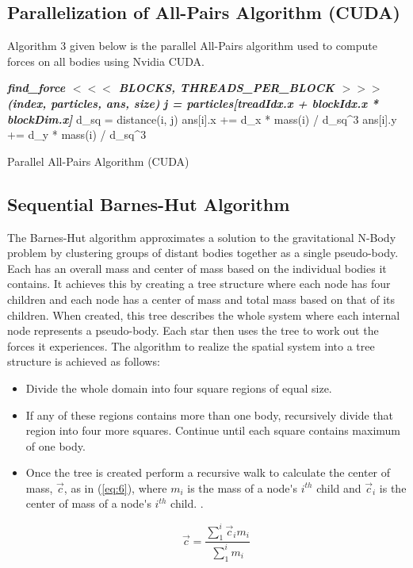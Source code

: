\subsection{Parallelization of All-Pairs Algorithm (CUDA)}

Algorithm 3 given below is the parallel All-Pairs algorithm used to compute forces on all bodies using Nvidia CUDA.

\begin{algorithm} 
\DontPrintSemicolon
{}
 {
   {
    \textbf{\textit{find\_force $<<<$ BLOCKS, THREADS\_PER\_BLOCK $>>>$ (index, particles, ans, size)}} \;
  }
}
\BlankLine
{}
 {
  \textbf{\textit{j = particles[treadIdx.x + blockIdx.x * blockDim.x]}} \;
   {
     d\_sq = distance(i, j) \;
     ans[i].x += d\_x * mass(i) / d\_sq\^{}3 \;
     ans[i].y += d\_y * mass(i) / d\_sq\^{}3 \;
    }
}
\label{algo:3}
\caption{Parallel All-Pairs Algorithm (CUDA)}
\end{algorithm}

\subsection{Sequential Barnes-Hut Algorithm}

The Barnes-Hut algorithm \cite{c8} approximates a solution to the gravitational N-Body problem by clustering groups of distant bodies together as a single pseudo-body. Each has an overall mass and center of mass based on the individual bodies it contains. It achieves this by creating a tree structure where each node has four children and each node has a center of mass and total mass based on that of its children. When created, this tree describes the whole system where each internal node represents a pseudo-body. Each star then uses the tree to work out the forces it experiences. The algorithm to realize the spatial system into a tree structure is achieved as follows:

\begin{itemize}
\item Divide the whole domain into four square regions of equal size.
\item If any of these regions contains more than one body, recursively divide that region into four more squares. Continue until each square contains maximum of one body.
\item Once the tree is created perform a recursive walk to calculate the center of mass, $\vec{c}$, as in (\ref{eq:6}), where $m_i$ is the mass of a node\'{}s $i^{th}$ child and $\vec{c}_i$ is the center of mass of a node\'{}s $i^{th}$ child.
.

\begin{equation} \label{eq:6}
\vec{c} = \frac{\sum_{1}^i\vec{c}_im_i}{\sum_{1}^im_i}
\end{equation}
\end{itemize}

